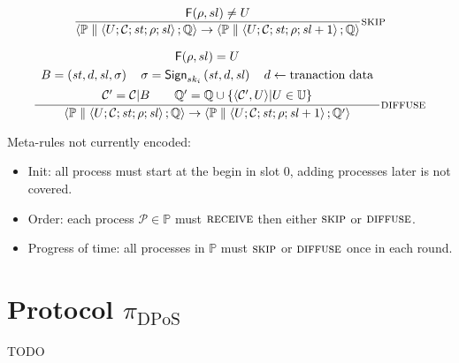 \documentclass{article}
\newcommand{\sPar}{\mathrel{\parallel}}
\newcommand{\sSystem}[2]{\left\langle #1 ; #2 \right\rangle}
\newcommand{\sProcess}[4]{\left\langle U ; #1 ; #2 ; #3 ; #4 \right\rangle}
\newcommand{\sChain}{\mathcal{C}}
\newcommand{\sState}{\mathit{st}}
\newcommand{\sSlot}{\mathit{sl}}
\newcommand{\sLeader}{\mathsf{F}}
\newcommand{\sQueue}{\mathbb{Q}}
\newcommand{\sProcesses}{\mathbb{P}}
\newcommand{\sBlock}[4]{\left( #1 , #2 , #3 , #4 \right)}
\newcommand{\sSign}[4]{\mathsf{Sign}_{#1}\left(#2, #3, #4\right)}
\begin{document}
\bigskip

\begin{equation*}
\frac{
    \sLeader(\rho, sl) \neq U
}{
  \sSystem{\sProcesses \sPar \sProcess{\sChain}{\sState}{\rho}{\sSlot}}{\sQueue}
\rightarrow
  \sSystem{\sProcesses \sPar \sProcess{\sChain}{\sState}{\rho}{\sSlot+1}}{\sQueue}
} \textsc{skip}
\end{equation*}

\bigskip

\begin{equation*}
\frac{
    \begin{array}{c}
    \sLeader(\rho, sl) = U
    \\[1mm]
    B = \sBlock{\sState}{d}{\sSlot}{\sigma}
    \quad
    \sigma = \sSign{sk_i}{\sState}{d}{\sSlot}
    \quad
    d \leftarrow \text{tranaction data}
    \\[1.5mm]
    \sChain' = \sChain | B
    \qquad
    \sQueue' = \sQueue \cup \{ \langle \sChain', U \rangle | U \in \mathbb{U} \}
    \end{array}
}{
  \sSystem{\sProcesses \sPar \sProcess{\sChain}{\sState}{\rho}{\sSlot}}{\sQueue}
\rightarrow
  \sSystem{\sProcesses \sPar \sProcess{\sChain}{\sState}{\rho}{\sSlot+1}}{\sQueue'}
} \textsc{diffuse}
\end{equation*}

\bigskip

Meta-rules not currently encoded:
\begin{itemize}
\item Init: all process must start at the begin in slot 0, adding processes later is not covered.
\item Order: each process $\mathcal{P} \in \mathbb{P}$ must $\textsc{receive}$ then
either $\textsc{skip}$ or $\textsc{diffuse}$.
\item Progress of time: all processes in $\mathbb{P}$ must $\textsc{skip}$ or $\textsc{diffuse}$
once in each round.
\end{itemize}


\section{Protocol $\pi_{\text{DPoS}}$}

TODO



\end{document}
